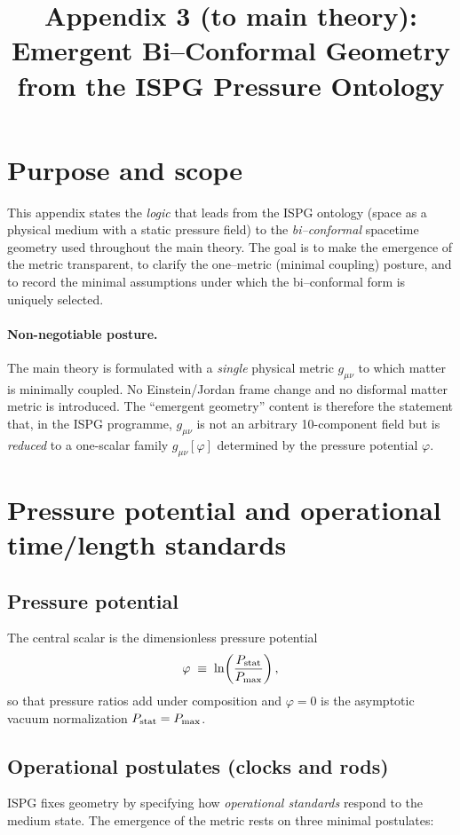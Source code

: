 \documentclass[11pt]{article}
\title{Appendix 3 (to main theory): Emergent Bi--Conformal Geometry from the ISPG Pressure Ontology}
\author{}
\date{}
\begin{document}
\let\phi\varphi
\maketitle

\section*{Purpose and scope}
This appendix states the \emph{logic} that leads from the ISPG ontology (space as a physical medium with a static pressure field) to the \emph{bi--conformal} spacetime geometry used throughout the main theory. The goal is to make the emergence of the metric transparent, to clarify the one--metric (minimal coupling) posture, and to record the minimal assumptions under which the bi--conformal form is uniquely selected.

\paragraph{Non-negotiable posture.}
The main theory is formulated with a \emph{single} physical metric $g_{\mu\nu}$ to which matter is minimally coupled. No Einstein/Jordan frame change and no disformal matter metric is introduced. The ``emergent geometry'' content is therefore the statement that, in the ISPG programme, $g_{\mu\nu}$ is not an arbitrary 10-component field but is \emph{reduced} to a one-scalar family $g_{\mu\nu}[\phi]$ determined by the pressure potential $\phi$.

\section{Pressure potential and operational time/length standards}\label{sec:operational}
\subsection{Pressure potential}
The central scalar is the dimensionless pressure potential
\begin{equation}
\phi \;\equiv\; \ln\!\left(\frac{P_{\rm stat}}{P_{\max}}\right),
\label{eq:phidef}
\end{equation}
so that pressure ratios add under composition and $\phi=0$ is the asymptotic vacuum normalization $P_{\rm stat}=P_{\max}$.

\subsection{Operational postulates (clocks and rods)}
ISPG fixes geometry by specifying how \emph{operational standards} respond to the medium state. The emergence of the metric rests on three minimal postulates:
\end{document}
